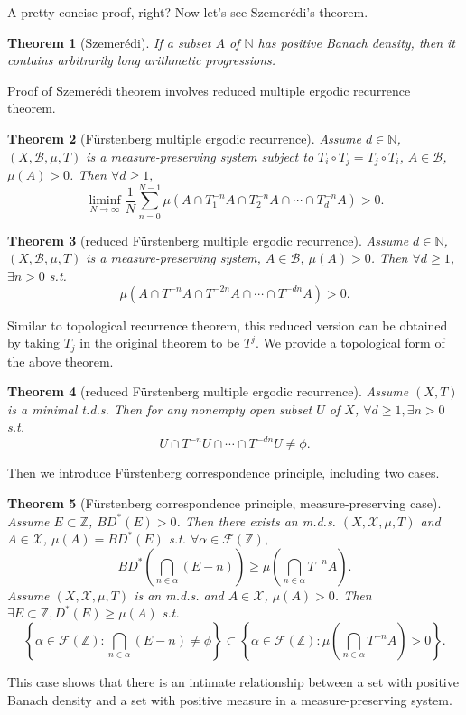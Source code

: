 \documentclass[12pt]{article}
\newtheorem{theorem}{Theorem}
\begin{document}
A pretty concise proof, right? Now let's see Szemer\'edi's theorem.
\begin{theorem}[Szemer\'edi]
If a subset $A$ of $\mathbb N$ has positive Banach density, then it contains arbitrarily long arithmetic progressions.
\end{theorem}
Proof of Szemer\'edi theorem involves reduced multiple ergodic recurrence theorem.
\begin{theorem}[F\"urstenberg multiple ergodic recurrence]
Assume $d\in \mathbb N$, $(X,\mathcal B, \mu,T)$ is a measure-preserving system subject to $T_i\circ T_j=T_j\circ T_i $, $A\in \mathcal B $, $\mu(A)>0 $. Then $\forall d \ge 1, $\[\liminf_{N\to\infty}\frac{1}{N}\sum_{n=0}^{N-1}\mu(A\cap T_1^{-n}A\cap T_2^{-n}A\cap\cdots\cap T_d^{-n}A)>0. \]
\end{theorem}
\begin{theorem}[reduced F\"urstenberg multiple ergodic recurrence]
Assume $d\in \mathbb N$, $(X,\mathcal B,\mu,T)$ is a measure-preserving system, $A\in\mathcal B$, $\mu(A)>0$. Then $\forall d\ge 1$,$\exists n>0$ s.t. \[\mu(A\cap T^{-n}A\cap T^{-2n}A\cap\cdots\cap T^{-dn}A)>0. \]
\end{theorem}
Similar to topological recurrence theorem, this reduced version can be obtained by taking $T_j $ in the original theorem to be $T^j $. We provide a topological form of the above theorem.
\begin{theorem}[reduced F\"urstenberg multiple ergodic recurrence] 
Assume $(X,T)$ is a minimal t.d.s. Then for any nonempty open subset $U$ of $X$, $\forall d\ge 1, \exists n>0 $ s.t. \[U\cap T^{-n}U\cap\cdots\cap T^{-dn}U\ne \phi. \]
\end{theorem}
Then we introduce F\"urstenberg correspondence principle, including two cases.
\begin{theorem}[F\"urstenberg correspondence principle, measure-preserving case]
Assume $E\subset \mathbb Z$, $BD^*(E)>0$. Then there exists an m.d.s. $(X,\mathcal X,\mu,T)$ and $A\in \mathcal X$, $\mu(A)=BD^*(E) $ s.t. $\forall \alpha \in \mathscr F(\mathbb Z), $\[BD^*\left(\bigcap_{n\in \alpha}(E-n) \right)\ge\mu\left(\bigcap_{n\in \alpha}T^{-n}A \right). \]
Assume $(X,\mathcal X,\mu,T)$ is an m.d.s. and $A\in\mathcal X$, $\mu(A)>0$. Then $\exists E\subset \mathbb Z, D^*(E)\ge \mu(A)$ s.t. \[\left\{\alpha\in\mathscr F(\mathbb Z):\bigcap_{n\in\alpha}(E-n)\ne \phi \right\}\subset\left\{\alpha\in\mathscr F(\mathbb Z):\mu\left(\bigcap_{n\in\alpha}T^{-n}A \right)>0 \right\}. \]
\end{theorem}
This case shows that there is an intimate relationship between a set with positive Banach density and a set with positive measure in a measure-preserving system.
\end{document}
